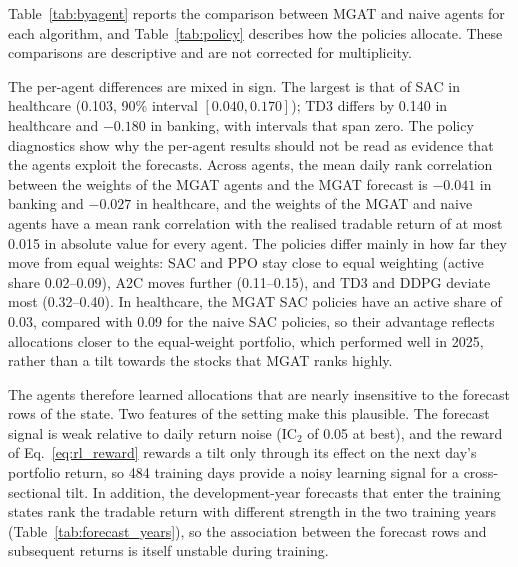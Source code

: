 \documentclass[pdflatex,sn-mathphys-num]{sn-jnl}%
\theoremstyle{thmstyleone}%
\theoremstyle{thmstyletwo}%
\theoremstyle{thmstylethree}%
\begin{document}
{\color{blue}Table~\ref{tab:byagent} reports the comparison between MGAT and naive agents for each algorithm, and Table~\ref{tab:policy} describes how the policies allocate. These comparisons are descriptive and are not corrected for multiplicity.

The per-agent differences are mixed in sign. The largest is that of SAC in healthcare (0.103, 90\% interval $[0.040, 0.170]$); TD3 differs by 0.140 in healthcare and $-0.180$ in banking, with intervals that span zero. The policy diagnostics show why the per-agent results should not be read as evidence that the agents exploit the forecasts. Across agents, the mean daily rank correlation between the weights of the MGAT agents and the MGAT forecast is $-0.041$ in banking and $-0.027$ in healthcare, and the weights of the MGAT and naive agents have a mean rank correlation with the realised tradable return of at most 0.015 in absolute value for every agent. The policies differ mainly in how far they move from equal weights: SAC and PPO stay close to equal weighting (active share 0.02--0.09), A2C moves further (0.11--0.15), and TD3 and DDPG deviate most (0.32--0.40). In healthcare, the MGAT SAC policies have an active share of 0.03, compared with 0.09 for the naive SAC policies, so their advantage reflects allocations closer to the equal-weight portfolio, which performed well in 2025, rather than a tilt towards the stocks that MGAT ranks highly.

The agents therefore learned allocations that are nearly insensitive to the forecast rows of the state. Two features of the setting make this plausible. The forecast signal is weak relative to daily return noise (IC$_2$ of 0.05 at best), and the reward of Eq.~\eqref{eq:rl_reward} rewards a tilt only through its effect on the next day's portfolio return, so 484 training days provide a noisy learning signal for a cross-sectional tilt. In addition, the development-year forecasts that enter the training states rank the tradable return with different strength in the two training years (Table~\ref{tab:forecast_years}), so the association between the forecast rows and subsequent returns is itself unstable during training.\par}
\end{document}
